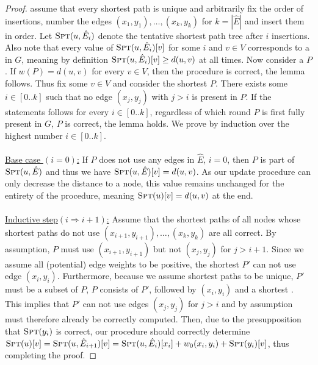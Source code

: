 \begin{proof}
    \Wlog assume that every shortest path is unique and arbitrarily fix the order of insertions, \ie number the edges $(x_1,y_1),\ldots,(x_k,y_k)$ for $k = |\hat{E}|$ and insert them in order.
    Let $\textsc{Spt}(u, \hat{E}_i)$ denote the tentative shortest path tree after $i$ insertions.
    Also note that every value of $\textsc{Spt}(u, \hat{E}_i)[v]$ for some $i$ and $v \in V$ corresponds to a  in $G$, meaning by definition $\textsc{Spt}(u, \hat{E}_i)[v] \geq d(u,v)$ at all times.
    Now consider a  $P$.
    If $w(P) = d(u, v)$ for every $v \in V$, then the procedure is correct, \ie the lemma follows.
    Thus fix some $v \in V$ and consider the shortest  $P$.
    There exists some $i \in [0..k]$ such that no edge $(x_j, y_j)$ with $j > i$ is present in $P$.
    If the statements follows for every $i \in [0..k]$, \ie regardless of which round $P$ is first fully present in $G$, $P$ is correct, the lemma holds.
    We prove by induction over the highest number $i \in [0..k]$. 
    \\
    \\
    \underline{Base case $(i = 0)$:} 
    If $P$ does not use any edges in $\hat{E}$, \ie $i = 0$, then $P$ is part of $\textsc{Spt}(u, \hat{E})$ and thus we have $\textsc{Spt}(u, \hat{E})[v] = d(u,v)$.
    As our update procedure can only decrease the distance to a node, this value remains unchanged for the entirety of the procedure, meaning $\textsc{Spt}(u)[v] = d(u,v)$ at the end. 
    \\
    \\
    \underline{Inductive step$(i \Rightarrow i + 1)$:}
    Assume that the shortest paths of all nodes whose shortest paths do not use $(x_{i + 1},y_{i + 1}),\ldots,(x_k,y_k)$ are all correct.
    By assumption, $P$ must use $(x_{i + 1},y_{i + 1})$ but not $(x_j,y_j)$ for $j > i + 1$.
    Since we assume all (potential) edge weights to be positive, the shortest  $P'$ can not use edge $(x_i,y_i)$.
    Furthermore, because we assume shortest paths to be unique, $P'$ must be a subset of $P$, \ie $P$ consists of $P'$, followed by $(x_i,y_i)$ and a shortest .
    This implies that $P'$ can not use edges $(x_j,y_j)$ for $j > i$ and by assumption must therefore already be correctly computed.
    Then, due to the presupposition that $\textsc{Spt}(y_i)$ is correct, our procedure should correctly determine $\spt(u)[v] = \spt(u, \hat{E}_{i + 1})[v] = \spt(u, \hat{E}_i)[x_i] + \wpot(x_i,y_i) + \spt(y_i)[v]$, thus completing the proof.
\end{proof}


